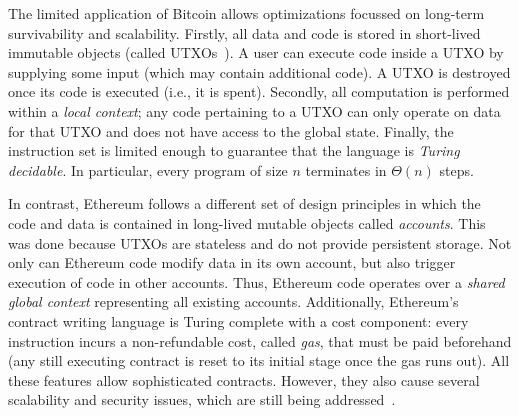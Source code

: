 \documentclass[runningheads]{llncs}
\newcommand{\ignore}[1]{}
\begin{document}
\ignore{
A useful way of representing a smart contract platform is to consider it as a {\em singleton computer}, where only one single-threaded instance exists in the entire world and everyone can use it for storage and computation by writing code in a language that the computer understands.
Bitcoin's language supports limited types of smart contracts, since its primary design goal was for a currency system. In this way, can think of Bitcoin as an {\em application specific} singleton computer, while Ethereum can be considered a {\em general purpose} singleton computer.
}

The limited application of Bitcoin allows optimizations focussed on long-term survivability and scalability. Firstly, all data and code is stored in short-lived immutable objects (called UTXOs~\cite{utxo}). A user can execute code inside a UTXO by supplying some input (which may contain additional code). A UTXO is destroyed once its code is executed (i.e., it is spent). Secondly, all computation is performed within a {\em local context}; any code pertaining to a UTXO can only operate on data for that UTXO and does not have access to the global state. Finally, the instruction set is limited enough to guarantee that the language is {\em Turing decidable}. In particular, every program of size $n$ terminates in $\Theta(n)$ steps. 

In contrast, Ethereum follows a different set of design principles in which the code and data is contained in long-lived mutable objects called {\em accounts}. This was done because UTXOs are stateless and do not provide persistent storage. 
Not only can Ethereum code modify data in its own account, but also trigger execution of code in other accounts. Thus, Ethereum code operates over a {\em shared global context} representing all existing accounts. 
Additionally, Ethereum's contract writing language is Turing complete with a cost component: every instruction incurs a non-refundable cost, called {\em gas}, that must be paid beforehand (any still executing contract is reset to its initial stage once the gas runs out). 
All these features allow sophisticated contracts. However, they also cause several scalability and security issues, which are still being addressed~\cite{Luu:2016:MSC:2976749.2978309,hackernoon17}. 

\end{document}
